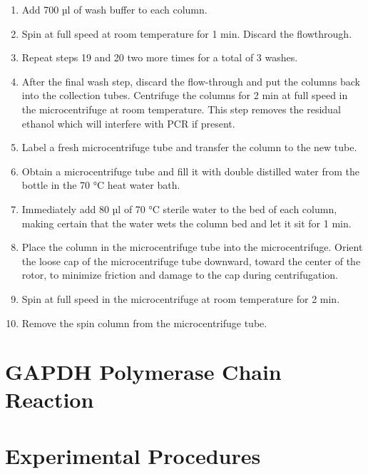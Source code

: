 \documentclass[]{book}
\providecommand{\tightlist}{%
  \setlength{\itemsep}{0pt}\setlength{\parskip}{0pt}}
\begin{document}
\begin{enumerate}
\def\labelenumi{\arabic{enumi}.}
\setcounter{enumi}{18}
\tightlist
\item
  Add 700 µl of wash buffer to each column.
\item
  Spin at full speed at room temperature for 1 min. Discard the flowthrough.
\item
  Repeat steps 19 and 20 two more times for a total of 3 washes.
\item
  After the final wash step, discard the flow-through and put the columns back into the collection tubes. Centrifuge the columns for 2 min at full speed in the microcentrifuge at room temperature. This step removes the residual ethanol which will interfere with PCR if present.
\item
  Label a fresh microcentrifuge tube and transfer the column to the new tube.
\item
  Obtain a microcentrifuge tube and fill it with double distilled water from the bottle in the 70 °C heat water bath.
\item
  Immediately add 80 µl of 70 °C sterile water to the bed of each column, making certain that the water wets the column bed and let it sit for 1 min.
\item
  Place the column in the microcentrifuge tube into the microcentrifuge. Orient the loose cap of the microcentrifuge tube downward, toward the center of the rotor, to minimize friction and damage to the cap during centrifugation.
\item
  Spin at full speed in the microcentrifuge at room temperature for 2 min.
\item
  Remove the spin column from the microcentrifuge tube.
\end{enumerate}

\hypertarget{gapdh-polymerase-chain-reaction}{%
\section{GAPDH Polymerase Chain Reaction}\label{gapdh-polymerase-chain-reaction}}

\hypertarget{experimental-procedures-9}{%
\section{Experimental Procedures}\label{experimental-procedures-9}}
\end{document}
